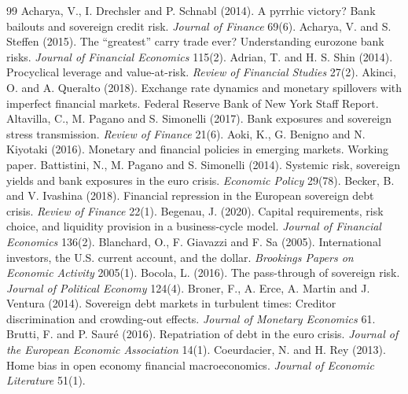 \documentclass[11pt]{article}
\begin{document}
\begin{thebibliography}{99}
\small
{} Acharya, V., I. Drechsler and P. Schnabl (2014). A pyrrhic victory? Bank bailouts and sovereign credit risk. \emph{Journal of Finance} 69(6).
 Acharya, V. and S. Steffen (2015). The ``greatest'' carry trade ever? Understanding eurozone bank risks. \emph{Journal of Financial Economics} 115(2).
 Adrian, T. and H. S. Shin (2014). Procyclical leverage and value-at-risk. \emph{Review of Financial Studies} 27(2).
 Akinci, O. and A. Queralto (2018). Exchange rate dynamics and monetary spillovers with imperfect financial markets. Federal Reserve Bank of New York Staff Report.
 Altavilla, C., M. Pagano and S. Simonelli (2017). Bank exposures and sovereign stress transmission. \emph{Review of Finance} 21(6).
 Aoki, K., G. Benigno and N. Kiyotaki (2016). Monetary and financial policies in emerging markets. Working paper.
 Battistini, N., M. Pagano and S. Simonelli (2014). Systemic risk, sovereign yields and bank exposures in the euro crisis. \emph{Economic Policy} 29(78).
 Becker, B. and V. Ivashina (2018). Financial repression in the European sovereign debt crisis. \emph{Review of Finance} 22(1).
 Begenau, J. (2020). Capital requirements, risk choice, and liquidity provision in a business-cycle model. \emph{Journal of Financial Economics} 136(2).
 Blanchard, O., F. Giavazzi and F. Sa (2005). International investors, the U.S. current account, and the dollar. \emph{Brookings Papers on Economic Activity} 2005(1).
 Bocola, L. (2016). The pass-through of sovereign risk. \emph{Journal of Political Economy} 124(4).
 Broner, F., A. Erce, A. Martin and J. Ventura (2014). Sovereign debt markets in turbulent times: Creditor discrimination and crowding-out effects. \emph{Journal of Monetary Economics} 61.
 Brutti, F. and P. Saur\'e (2016). Repatriation of debt in the euro crisis. \emph{Journal of the European Economic Association} 14(1).
 Coeurdacier, N. and H. Rey (2013). Home bias in open economy financial macroeconomics. \emph{Journal of Economic Literature} 51(1).

\end{thebibliography}
\end{document}
